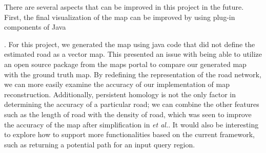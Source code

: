 \documentclass[11pt]{article}
\begin{document}
There are several aspects that can be improved in this project in the future. First, the final visualization of the map can be improved by using plug-in components of Java \begin{comment}This seems out of place/doesn't quite make any sense \end{comment}. For this project, we generated the map using java code that did not define the estimated road as a vector map. This presented an issue with being able to utilize an open source package from the maps  portal to compare our generated map with the ground truth map. By redefining the representation of the road network, we can more easily examine the accuracy of our implementation of map reconstruction.%
Additionally, persistent homology is not the only factor in determining the accuracy of a particular road; we can combine the other features such as the length of road with the density of road, which was seen to improve the accuracy of the map after simplification in \textit{et al.}.
It would also be interesting to explore how to support more functionalities
based on the current framework, such as returning a potential
path for an input query region.





{}

\end{document}
